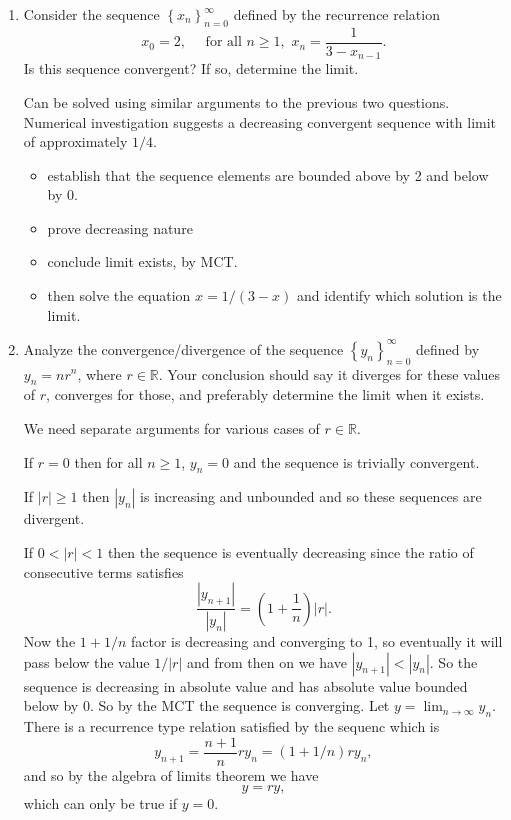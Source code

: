 \documentclass[oneside,10pt]{amsart}
\newcounter{pass}
\begin{document}
\begin{enumerate}
\begin{solution}
So by the Monotone Convergence Theorem the sequence is convergent. If we let $a = \lim_{n \to \infty} a_n$ and apply the algebra of limits theorem to the recurrence relation we get
$$a = 3 - 1/a.$$
This is equivalent to
$$a^2 - 3a + 1 = 0.$$
This has the solutions
$$a = -\frac{1}{2} \, \sqrt{5} + \frac{3}{2}, \quad a = \frac{1}{2} \, \sqrt{5} + \frac{3}{2}.$$
But only the second one of these is in the range $1\leq a < 3$ so we conclude that the limit of the sequence is
$$a = \frac{1}{2} \, \sqrt{5} + \frac{3}{2} \approx 2.62 .$$
\end{solution}
\item
Consider the sequence $\left \{ x_n \right \}_{n=0}^\infty$ defined by the recurrence relation
\[ x_0 = 2 , \quad \text{ for all } n \geq 1, \, \, x_{n} = \frac{1}{3 - x_{n-1}}.\]
Is this sequence convergent? If so, determine the limit.
\begin{solution}
Can be solved using similar arguments to the previous two questions. Numerical investigation suggests a decreasing convergent sequence with limit of approximately $1/4$.
\begin{itemize}
\item
establish that the sequence elements are bounded above by 2 and below by 0.
\item
prove decreasing nature
\item
conclude limit exists, by MCT.
\item
then solve the equation $x=1/(3-x)$ and identify which solution is the limit.
\end{itemize}
\end{solution}
\item
Analyze the convergence/divergence of the sequence $\left \{ y_n \right \}_{n=0}^\infty$ defined by $y_n = nr^n$, where $r \in \mathbb{R}$. Your conclusion should say it diverges for these values of $r$, converges for those, and preferably determine the limit when it exists.
\begin{solution}{
We need separate arguments for various cases of $r \in \mathbb{R}$.

If $r=0$ then for all $n \geq 1$, $y_n = 0$ and the sequence is trivially convergent.

If $|r| \geq 1$ then $|y_n|$ is increasing and unbounded and so these sequences are divergent.

If $0<|r| < 1$ then the sequence is eventually decreasing since the ratio of consecutive terms satisfies
$$\frac{|y_{n+1}|}{|y_n|} = \left ( 1 + \frac{1}{n} \right ) |r|.$$
Now the $1+1/n$ factor is decreasing and converging to 1, so eventually it will pass below the value $1/|r|$ and from then on we have $|y_{n+1}| < |y_n|$. So the sequence is decreasing in absolute value and has absolute value bounded below by 0. So by the MCT the sequence is converging. Let $y = \lim_{n \to \infty} y_n$. There is a recurrence type relation satisfied by the sequenc which is
$$ y_{n+1} = \frac{n+1}{n} r y_n = (1+1/n)r y_n,$$
and so by the algebra of limits theorem we have
$$ y = r y,$$
which can only be true if $y=0$.
}\end{solution}
\setcounter{pass}{\value{enumi}}
\end{enumerate}
\end{document}
